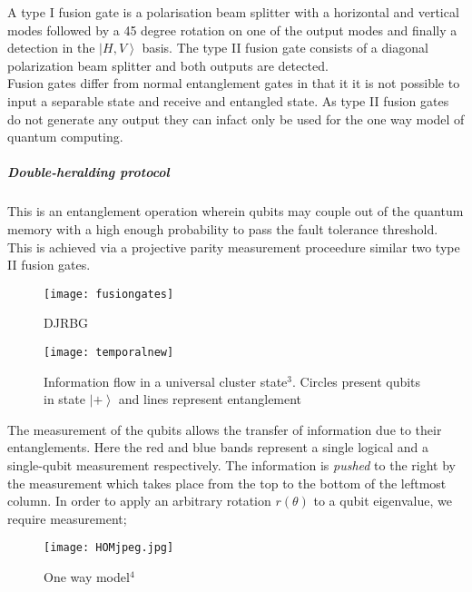 \documentclass{article}
\numberwithin{equation}{section} %
\newcommand{\ket}[1]{\left| #1 \right>} %
\begin{document}
 A type I fusion gate is a polarisation beam splitter with a horizontal and vertical modes followed by a 45 degree rotation on one of the output modes and finally a detection in the $\ket{H,V}$ basis. The type II fusion gate consists of a diagonal polarization beam splitter and both outputs are detected.  \\
 
 Fusion gates differ from normal entanglement gates in that it it is not possible to input a separable state and receive and entangled state. As type II fusion gates do not generate any output they can infact only be used for the one way model of quantum computing. 
 
 \subparagraph{Double-heralding protocol}
 
 This is an entanglement operation wherein qubits may couple out of the quantum memory with a high enough probability to pass the fault tolerance threshold. This is achieved via a projective parity measurement proceedure similar two type II fusion gates.
 

\begin{figure}[h]
\begin{center}
\texttt{[image: fusiongates]}
\caption{DJRBG}
\label{just}
\end{center}
\end{figure}


\begin{figure}[h]
\begin{center}
\texttt{[image: temporalnew]} \\
\caption{Information flow in a universal cluster state$^3$. Circles present qubits in state $\ket{+}$ and lines represent entanglement}
\label{fig:temporal}
\end{center}
\end{figure}   

  The measurement of the qubits allows the transfer of information due to their entanglements. Here the red and blue bands represent a single logical and a single-qubit measurement respectively. The information is \emph{pushed} to the right by the measurement which takes place from the top to the bottom of the leftmost column. In order to apply an arbitrary rotation $r(\theta)$ to a qubit eigenvalue, we require measurement; 
       
\begin{figure}[h]
\begin{center}
\texttt{[image: HOMjpeg.jpg]}
\caption{One way model$^4$}
\label{info}
\end{center}
\end{figure}
\end{document}
